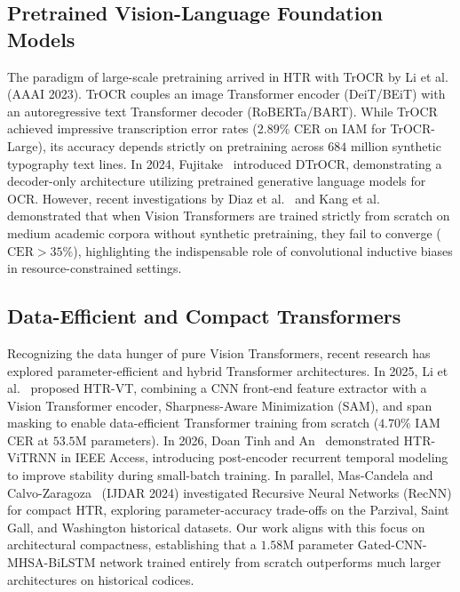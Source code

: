 \documentclass{IEEEtran}
\begin{document}
\subsection{Pretrained Vision-Language Foundation Models}

The paradigm of large-scale pretraining arrived in HTR with TrOCR by Li et al.~\cite{li2023trocr} (AAAI 2023). TrOCR couples an image Transformer encoder (DeiT/BEiT) with an autoregressive text Transformer decoder (RoBERTa/BART). While TrOCR achieved impressive transcription error rates ($2.89\%$ CER on IAM for TrOCR-Large), its accuracy depends strictly on pretraining across $684$ million synthetic typography text lines. In 2024, Fujitake~\cite{fujitake2024dtrocr} introduced DTrOCR, demonstrating a decoder-only architecture utilizing pretrained generative language models for OCR. However, recent investigations by Diaz et al.~\cite{diaz2022rethinking} and Kang et al.~\cite{kang2023evaluating} demonstrated that when Vision Transformers are trained strictly from scratch on medium academic corpora without synthetic pretraining, they fail to converge ($\text{CER} > 35\%$), highlighting the indispensable role of convolutional inductive biases in resource-constrained settings.

\subsection{Data-Efficient and Compact Transformers}

Recognizing the data hunger of pure Vision Transformers, recent research has explored parameter-efficient and hybrid Transformer architectures. In 2025, Li et al.~\cite{li2025htr} proposed HTR-VT, combining a CNN front-end feature extractor with a Vision Transformer encoder, Sharpness-Aware Minimization (SAM), and span masking to enable data-efficient Transformer training from scratch ($4.70\%$ IAM CER at $53.5\text{M}$ parameters). In 2026, Doan Tinh and An~\cite{doantinh2026} demonstrated HTR-ViTRNN in IEEE Access, introducing post-encoder recurrent temporal modeling to improve stability during small-batch training. In parallel, Mas-Candela and Calvo-Zaragoza~\cite{mascandela2024} (IJDAR 2024) investigated Recursive Neural Networks (RecNN) for compact HTR, exploring parameter-accuracy trade-offs on the Parzival, Saint Gall, and Washington historical datasets. Our work aligns with this focus on architectural compactness, establishing that a $1.58\text{M}$ parameter Gated-CNN-MHSA-BiLSTM network trained entirely from scratch outperforms much larger architectures on historical codices.
\end{document}
